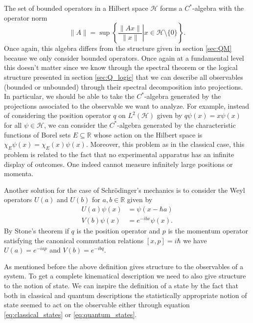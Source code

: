 \begin{example}
The set of bounded operators in a Hilbert space $\mathcal{H}$ forms a $C^*$-algebra with the operator norm
\begin{equation}
\|A\|=\sup\left\{\left.\frac{\|Ax\|}{\|x\|}\right|x\in\mathcal{H}\setminus \{0\} \right\}.
\end{equation}
Once again, this algebra differs from the structure given in section \ref{sec:QM} because we only consider bounded operators. Once again at a fundamental level this doesn't matter since we know through the spectral theorem or the logical structure presented in section \ref{sec:Q_logic} that we can describe all observables (bounded or unbounded) through their spectral decomposition into projections. In particular, we should be able to take the $C^*$-algebra generated by the projections associated to the observable we want to analyze. For example, instead of considering the position operator $q$ on $L^2(\mathcal{H})$ given by $q\psi(x)=x\psi(x)$ for all $\psi\in\mathcal{H}$, we can consider the $C^*$-algebra generated by the characteristic functions of Borel sets $E\subseteq\mathbb{R}$ whose action on the Hilbert space is $\chi_E\psi(x) = \chi_E(x)\psi(x)$. Moreover, this problem as in the classical case, this problem is related to the fact that no experimental apparatus has an infinite display of outcomes. One indeed cannot measure infinitely large positions or momenta.

Another solution for the case of Schrödinger's mechanics is to consider the Weyl operators $U(a)$ and $U(b)$ for $a,b\in\mathbb{R}$ given by
\begin{align}
U(a)\psi(x) &= \psi(x-\hbar a) \\
V(b)\psi(x) &= e^{-ibx}\psi(x). 
\end{align}
By Stone's theorem if $q$ is the position operator and $p$ is the momentum operator satisfying the canonical commutation relations $[x,p]=i\hbar$ we have $U(a)=e^{-iap}$ and $V(b)=e^{-ibq}$\cite{Strocchi2008a}. 
\end{example}

As mentioned before the above definition gives structure to the observables of a system. To get a complete kinematical description we need to also give structure to the notion of state. We can inspire the definition of a state by the fact that both in classical and quantum descriptions the statistically appropriate notion of state seemed to act on the observable either through equation \ref{eq:classical_states} or \ref{eq:quantum_states}.

